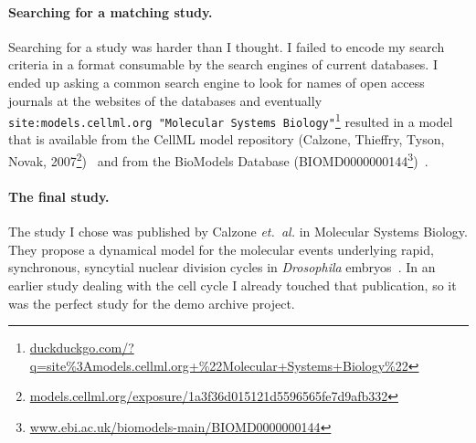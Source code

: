 \paragraph{Searching for a matching study.}
Searching for a study was harder than I thought.
I failed to encode my search criteria in a format consumable by the search engines of current databases.
I ended up asking a common search engine to look for names of open access journals at the websites of the databases and eventually \texttt{site:models.cellml.org "Molecular Systems Biology"}\footnote{\href{https://duckduckgo.com/?q=site\%3Amodels.cellml.org+\%22Molecular+Systems+Biology\%22}{duckduckgo.com/?q=site\%3Amodels.cellml.org+\%22Molecular+Systems+Biology\%22}} resulted in a model that is available from the CellML model repository (Calzone, Thieffry, Tyson, Novak, 2007\footnote{\href{http://models.cellml.org/exposure/1a3f36d015121d5596565fe7d9afb332}{models.cellml.org/exposure/1a3f36d015121d5596565fe7d9afb332}})~\cite{cellmlrepo} and from the BioModels Database (BIOMD0000000144\footnote{\href{http://www.ebi.ac.uk/biomodels-main/BIOMD0000000144}{www.ebi.ac.uk/biomodels-main/BIOMD0000000144}})~\cite{biomodels}.


\paragraph{The final study.}
The study I chose was published by Calzone \emph{et.~al.} in Molecular Systems Biology. They propose a dynamical model for the molecular events underlying rapid, synchronous, syncytial nuclear division cycles in \textit{Drosophila} embryos~\cite{Calzone2007}.
In an earlier study dealing with the cell cycle I already touched that publication, so it was the perfect study for the demo archive project.




